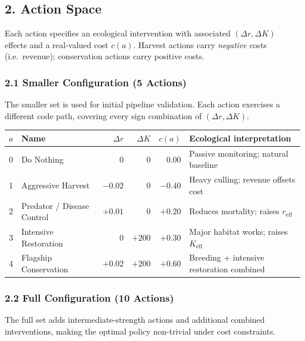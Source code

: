 \documentclass[11pt]{article}
\begin{document}
\subsection*{2. Action Space}
Each action specifies an ecological intervention with associated $(\Delta r, \Delta K)$ effects and a real-valued cost $c(a)$. Harvest actions carry \emph{negative} costs (i.e.\ revenue); conservation actions carry positive costs.

\subsubsection*{2.1 Smaller Configuration (5 Actions)}

The smaller set is used for initial pipeline validation. Each action exercises a different code path, covering every sign combination of $(\Delta r, \Delta K)$.

\begin{center}
\begin{tabular}{clrrrl}
\hline
$a$ & Name & $\Delta r$ & $\Delta K$ & $c(a)$ & Ecological interpretation \\
\hline
0 & Do Nothing                  & $0$     & $0$    & $0.00$  & Passive monitoring; natural baseline \\
1 & Aggressive Harvest          & $-0.02$ & $0$    & $-0.40$ & Heavy culling; revenue offsets cost \\
2 & Predator / Disease Control  & $+0.01$ & $0$    & $+0.20$ & Reduces mortality; raises $r_{\mathrm{eff}}$ \\
3 & Intensive Restoration       & $0$     & $+200$ & $+0.30$ & Major habitat works; raises $K_{\mathrm{eff}}$ \\
4 & Flagship Conservation       & $+0.02$ & $+200$ & $+0.60$ & Breeding + intensive restoration combined \\
\hline
\end{tabular}
\end{center}

\subsubsection*{2.2 Full Configuration (10 Actions)}

The full set adds intermediate-strength actions and additional combined interventions, making the optimal policy non-trivial under cost constraints.
\end{document}
